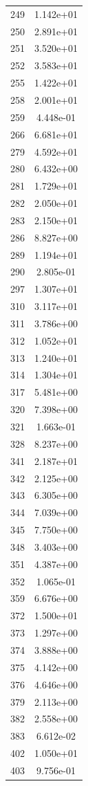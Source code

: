 \documentclass[12pt]{article}
\begin{document}
\begin{longtable}{@{}cc@{}}
249 & 1.142e+01 \\
250 & 2.891e+01 \\
251 & 3.520e+01 \\
252 & 3.583e+01 \\
255 & 1.422e+01 \\
258 & 2.001e+01 \\
259 & 4.448e-01 \\
266 & 6.681e+01 \\
279 & 4.592e+01 \\
280 & 6.432e+00 \\
281 & 1.729e+01 \\
282 & 2.050e+01 \\
283 & 2.150e+01 \\
286 & 8.827e+00 \\
289 & 1.194e+01 \\
290 & 2.805e-01 \\
297 & 1.307e+01 \\
310 & 3.117e+01 \\
311 & 3.786e+00 \\
312 & 1.052e+01 \\
313 & 1.240e+01 \\
314 & 1.304e+01 \\
317 & 5.481e+00 \\
320 & 7.398e+00 \\
321 & 1.663e-01 \\
328 & 8.237e+00 \\
341 & 2.187e+01 \\
342 & 2.125e+00 \\
343 & 6.305e+00 \\
344 & 7.039e+00 \\
345 & 7.750e+00 \\
348 & 3.403e+00 \\
351 & 4.387e+00 \\
352 & 1.065e-01 \\
359 & 6.676e+00 \\
372 & 1.500e+01 \\
373 & 1.297e+00 \\
374 & 3.888e+00 \\
375 & 4.142e+00 \\
376 & 4.646e+00 \\
379 & 2.113e+00 \\
382 & 2.558e+00 \\
383 & 6.612e-02 \\
402 & 1.050e+01 \\
403 & 9.756e-01 \\

\end{longtable}
\end{document}
